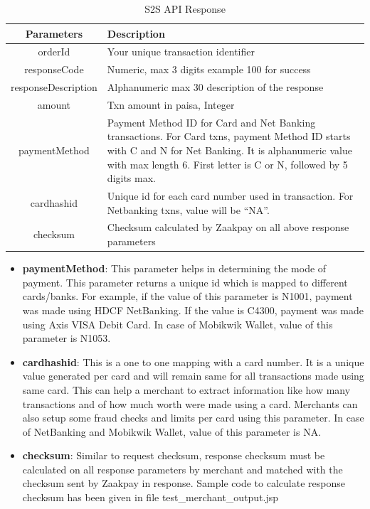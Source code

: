 \documentclass{article}
\begin{document}
\begin{longtable}{||c|p{12.5cm}||}
       \caption{S2S API Response}\\
   \rowcolor{green!50}
\bfseries{Parameters} & \bfseries{Description} \\ \hline
orderId & Your unique transaction identifier \\
responseCode & Numeric, max 3 digits example 100 for success\\
responseDescription & Alphanumeric max 30 description of the response\\
amount & Txn amount in paisa, Integer \\
paymentMethod & Payment Method ID for Card and Net Banking transactions. For Card txns, payment Method ID starts with C and N for Net Banking. It is alphanumeric value with max length 6. First letter is C or N, followed by 5 digits max.\\
cardhashid & Unique id for each card number used in transaction. For Netbanking txns, value will be “NA”.\\
checksum & Checksum calculated by Zaakpay on all above response
parameters


\end{longtable}
\begin{itemize}
\item {\bfseries paymentMethod}: This parameter helps in determining the mode of payment. This parameter returns a unique id which is mapped to different cards/banks. For example, if the value of this parameter is N1001, payment was made using HDCF NetBanking. If the value is C4300, payment was made using Axis VISA Debit Card.
In case of Mobikwik Wallet, value of this parameter is N1053.
\item {\bfseries cardhashid}: This is a one to one mapping with a card number. It is a unique value generated per card and will remain same for all transactions made using same card. This can help a merchant to extract information like how many transactions and of how much worth were made using a card.  Merchants can also setup some fraud checks and limits per  card using this parameter. In case of NetBanking and Mobikwik Wallet, value of this parameter is NA. 
\item {\bfseries checksum}: Similar to request checksum, response checksum must be calculated on all response parameters by merchant and matched with the checksum sent by Zaakpay in response. Sample code to calculate response checksum has been given in file test\_merchant\_output.jsp
\end{itemize}
\newpage
\end{document}

